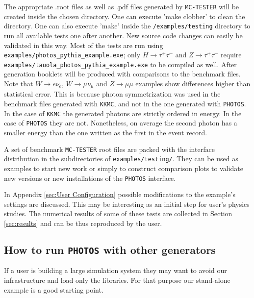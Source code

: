 \documentclass[]{Photos_interface_design}
\begin{document}
The appropriate .root files as well as .pdf files generated by {\tt MC-TESTER}
will be created inside the chosen directory. One can execute 'make clobber' to
clean the directory. One can also execute 'make' inside the {\tt /examples/testing}
directory to run all available tests one after another. New source
code changes can easily be validated in this way.
Most of the tests are run using {\tt examples/photos\_pythia\_example.exe};
only $H \rightarrow \tau^+ \tau^-$ and $Z \rightarrow \tau^+ \tau^-$ require
{\tt examples/tauola\_photos\_pythia\_example.exe} to be compiled as well.
After generation booklets will be produced with comparisons to the benchmark files.
Note that $W \rightarrow e \nu_e$, $W \rightarrow \mu \nu_\mu$ and $Z \rightarrow \mu \mu$
examples  show differences higher than statistical error. This is because  photon symmetrization
was used in the benchmark files generated with {\tt KKMC}, and not in the one generated with {\tt PHOTOS}.
In the case of {\tt KKMC} the generated photons are strictly ordered in energy. In the case of {\tt PHOTOS}
they are not. Nonetheless, on average the second photon has a smaller energy than the one written as the first
in the event record.


A set of benchmark {\tt MC-TESTER} root files are packed with the interface
distribution in the subdirectories of {\tt examples/testing/}. They can be used
as examples to start new work or simply to construct comparison
plots to validate new versions or new installations of the {\tt PHOTOS} interface.

In Appendix \ref{sec:User Configuration} possible modifications to the  
example's settings are discussed. This may be interesting as an initial step for user's 
physics studies.  The numerical results of some of these tests are collected in Section \ref{sec:results}
and can be thus reproduced by the user.

\subsection{How to run {\tt PHOTOS} with other generators}
If a user is building a large simulation system they may want to avoid our 
infrastructure and load only the libraries. For that purpose our stand-alone 
example is a good starting point.
\end{document}

